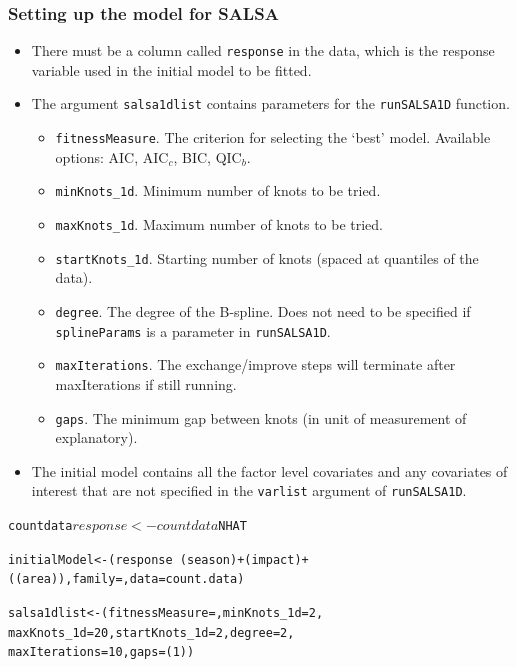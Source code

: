 \begin{frame}[fragile]
\frametitle{Setting up the model for SALSA}
\begin{itemize}
\item There must be a column called {\tt response} in the data, which is the response variable used in the initial model to be fitted.
\item The argument {\tt salsa1dlist} contains parameters for the {\tt runSALSA1D} function.  
\begin{itemize}
\item {\tt fitnessMeasure}. The criterion for selecting the `best' model.  Available options: AIC, AIC$_c$, BIC, QIC$_b$.
\item {\tt minKnots\_1d}. Minimum number of knots to be tried.
\item {\tt maxKnots\_1d}. Maximum number of knots to be tried.
\item {\tt startKnots\_1d}. Starting number of knots (spaced at quantiles of the data).
\item {\tt degree}. The degree of the B-spline. Does not need to be specified if {\tt splineParams} is a parameter in {\tt runSALSA1D}.
\item {\tt maxIterations}. The exchange/improve steps will terminate after maxIterations if still running.
\item {\tt gaps}. The minimum gap between knots (in unit of measurement of explanatory).
\end{itemize}
\item The initial model contains all the factor level covariates and any covariates of interest that are not specified in the {\tt varlist} argument of {\tt runSALSA1D}.
\end{itemize}

\begin{knitrout}\footnotesize
{}\color{fgcolor}\begin{kframe}
\begin{alltt}
countdata$response <- countdata$NHAT

initialModel <- (response ~ (season) + (impact) + 
    ((area)), family = , data = count.data)

salsa1dlist <- (fitnessMeasure = , minKnots_1d = 2, 
                    maxKnots_1d = 20, startKnots_1d = 2, degree = 2, 
                    maxIterations = 10, gaps = (1))
\end{alltt}
\end{kframe}
\end{knitrout}


\end{frame}
